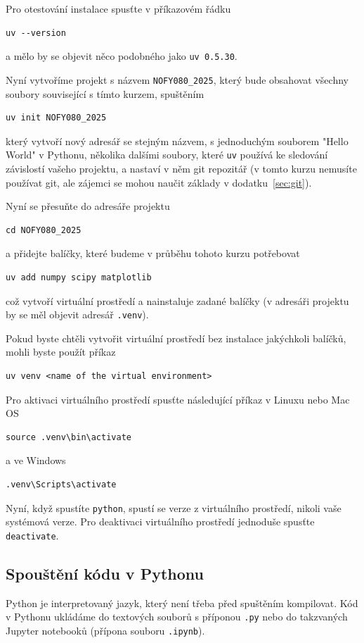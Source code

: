 Pro otestování instalace spusťte v příkazovém řádku
\begin{lstlisting}
uv --version
\end{lstlisting}
a mělo by se objevit něco podobného jako \verb|uv 0.5.30|.

Nyní vytvoříme projekt s názvem \verb|NOFY080_2025|, který bude obsahovat všechny soubory související s tímto kurzem, spuštěním
\begin{lstlisting}
uv init NOFY080_2025
\end{lstlisting}
který vytvoří nový adresář se stejným názvem, s jednoduchým souborem "Hello World" v Pythonu, několika dalšími soubory, které \verb|uv| používá ke sledování závislostí vašeho projektu, a nastaví v něm git repozitář (v tomto kurzu nemusíte používat git, ale zájemci se mohou naučit základy v dodatku~\ref{sec:git}).

Nyní se přesuňte do adresáře projektu
\begin{lstlisting}
cd NOFY080_2025
\end{lstlisting}
a přidejte balíčky, které budeme v průběhu tohoto kurzu potřebovat
\begin{lstlisting}
uv add numpy scipy matplotlib
\end{lstlisting}
což vytvoří virtuální prostředí a nainstaluje zadané balíčky (v adresáři projektu by se měl objevit adresář \verb|.venv|).

Pokud byste chtěli vytvořit virtuální prostředí bez instalace jakýchkoli balíčků, mohli byste použít příkaz
\begin{lstlisting}
uv venv <name of the virtual environment>
\end{lstlisting}

Pro aktivaci virtuálního prostředí spusťte následující příkaz v Linuxu nebo Mac OS
\begin{lstlisting}
source .venv\bin\activate
\end{lstlisting}
a ve Windows
\begin{lstlisting}
.venv\Scripts\activate
\end{lstlisting}

Nyní, když spustíte \verb|python|, spustí se verze z virtuálního prostředí, nikoli vaše systémová verze. Pro deaktivaci virtuálního prostředí jednoduše spusťte \verb|deactivate|.

\subsection{Spouštění kódu v Pythonu}
Python je interpretovaný jazyk, který není třeba před spuštěním kompilovat. Kód v Pythonu ukládáme do textových souborů s příponou \verb|.py| nebo do takzvaných Jupyter notebooků (přípona souboru \verb|.ipynb|).

